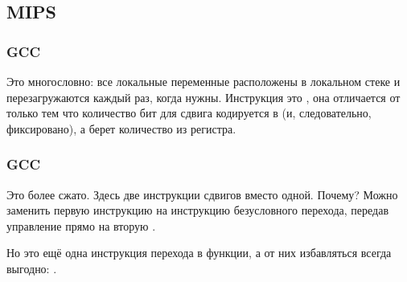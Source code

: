 \subsection{MIPS}

\subsubsection{\NonOptimizing GCC}



Это многословно: все локальные переменные расположены в локальном стеке и перезагружаются каждый раз,
когда нужны.
Инструкция \SLLV это , она отличается от \SLL только тем что
количество бит для сдвига кодируется в \SLL (и, следовательно, фиксировано), а \SLL берет количество из регистра.

\subsubsection{\Optimizing GCC}

Это более сжато.
Здесь две инструкции сдвигов вместо одной.
Почему?
Можно заменить первую инструкцию \SLLV на инструкцию безусловного перехода, передав управление прямо
на вторую \SLLV.

Но это ещё одна инструкция перехода в функции, а от них избавляться всегда выгодно: .


